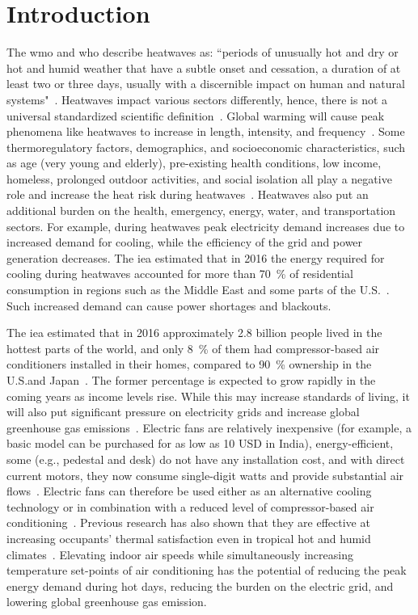 
\section{Introduction}\label{sec:introduction}

The \ac{wmo} and \ac{who} describe heatwaves as: ``periods of unusually hot and dry or hot and humid weather that have a subtle onset and cessation, a duration of at least two or three days, usually with a discernible impact on human and natural systems"~\cite{WMO2015}.
Heatwaves impact various sectors differently, hence, there is not a universal standardized scientific definition~\cite{Perkins2013}.
Global warming will cause peak phenomena like heatwaves to increase in length, intensity, and frequency~\cite{Whatharm75:online}.
Some thermoregulatory factors, demographics, and socioeconomic characteristics, such as age (very young and elderly), pre-existing health conditions, low income, homeless, prolonged outdoor activities, and social isolation all play a negative role and increase the heat risk during heatwaves~\cite{WMO2015}.
Heatwaves also put an additional burden on the health, emergency, energy, water, and transportation sectors.
For example, during heatwaves peak electricity demand increases due to increased demand for cooling, while the efficiency of the grid and power generation decreases.
The \ac{iea} estimated that in 2016 the energy required for cooling during heatwaves accounted for more than 70~\% of residential consumption in regions such as the Middle East and some parts of the U.S.~\cite{IEA2018}.
Such increased demand can cause power shortages and blackouts.

The \ac{iea} estimated that in 2016 approximately 2.8 billion people lived in the hottest parts of the world, and only 8~\% of them had compressor-based air conditioners installed in their homes, compared to 90~\% ownership in the U.S.\@ and Japan~\cite{IEA2018}.
The former percentage is expected to grow rapidly in the coming years as income levels rise.
While this may increase standards of living, it will also put significant pressure on electricity grids and increase global greenhouse gas emissions~\cite{IEA2018}.
Electric fans are relatively inexpensive (for example, a basic model can be purchased for as low as 10 USD in India), energy-efficient, some (e.g., pedestal and desk) do not have any installation cost, and with direct current motors, they now consume single-digit watts and provide substantial air flows~\cite{Yang2015a}.
Electric fans can therefore be used either as an alternative cooling technology or in combination with a reduced level of compressor-based air conditioning~\cite{Jay2019a, Hoyt2015, Schiavon2008}.
Previous research has also shown that they are effective at increasing occupants' thermal satisfaction even in tropical hot and humid climates~\cite{Lipczynska2018a}.
Elevating indoor air speeds while simultaneously increasing temperature set-points of air conditioning has the potential of reducing the peak energy demand during hot days, reducing the burden on the electric grid, and lowering global greenhouse gas emission.

